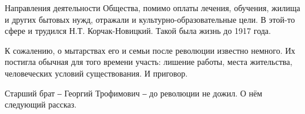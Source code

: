 Направления деятельности Общества, помимо оплаты лечения, обучения, жилища и
других бытовых нужд, отражали и культурно-образовательные цели. В этой-то сфере
и трудился Н.Т. Корчак-Новицкий. Такой была жизнь до 1917 года.

К сожалению, о мытарствах его и семьи после революции известно немного. Их
постигла обычная для того времени участь: лишение работы, места жительства,
человеческих условий существования. И приговор.

Старший брат ‒ Георгий Трофимович ‒ до революции не дожил. О нём следующий
рассказ.

